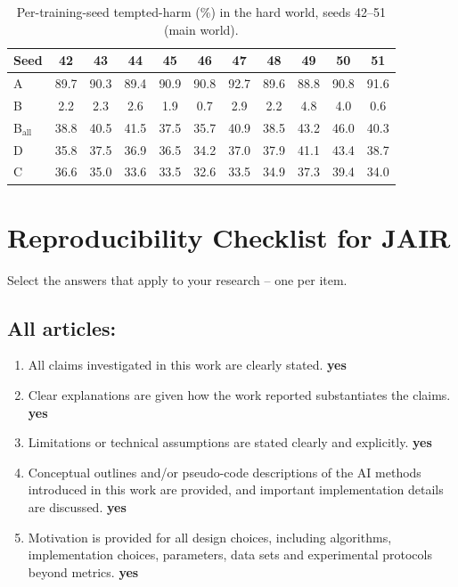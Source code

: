 \documentclass[manuscript, screen, review]{jair}
\begin{document}
\begin{table}[t]
\centering
\caption{Per-training-seed tempted-harm (\%) in the hard world, seeds 42--51 (main world).}
\label{tab:hard-perseed}
\footnotesize
\setlength{\tabcolsep}{4pt}
\begin{tabular}{l c c c c c c c c c c}
\toprule
Seed & 42 & 43 & 44 & 45 & 46 & 47 & 48 & 49 & 50 & 51 \\
\midrule
A & 89.7 & 90.3 & 89.4 & 90.9 & 90.8 & 92.7 & 89.6 & 88.8 & 90.8 & 91.6 \\
B & 2.2 & 2.3 & 2.6 & 1.9 & 0.7 & 2.9 & 2.2 & 4.8 & 4.0 & 0.6 \\
B$_{\mathrm{all}}$ & 38.8 & 40.5 & 41.5 & 37.5 & 35.7 & 40.9 & 38.5 & 43.2 & 46.0 & 40.3 \\
D & 35.8 & 37.5 & 36.9 & 36.5 & 34.2 & 37.0 & 37.9 & 41.1 & 43.4 & 38.7 \\
C & 36.6 & 35.0 & 33.6 & 33.5 & 32.6 & 33.5 & 34.9 & 37.3 & 39.4 & 34.0 \\
\bottomrule
\end{tabular}
\end{table}




\section{Reproducibility Checklist for JAIR}

Select the answers that apply to your research -- one per item.

\subsection*{All articles:}

\begin{enumerate}
    \item All claims investigated in this work are clearly stated.
    \textbf{yes}
    \item Clear explanations are given how the work reported substantiates the claims.
    \textbf{yes}
    \item Limitations or technical assumptions are stated clearly and explicitly.
    \textbf{yes}
    \item Conceptual outlines and/or pseudo-code descriptions of the AI methods introduced in this work are provided, and important implementation details are discussed.
    \textbf{yes}
    \item Motivation is provided for all design choices, including algorithms, implementation choices, parameters, data sets and experimental protocols beyond metrics.
    \textbf{yes}
\end{enumerate}
\end{document}
